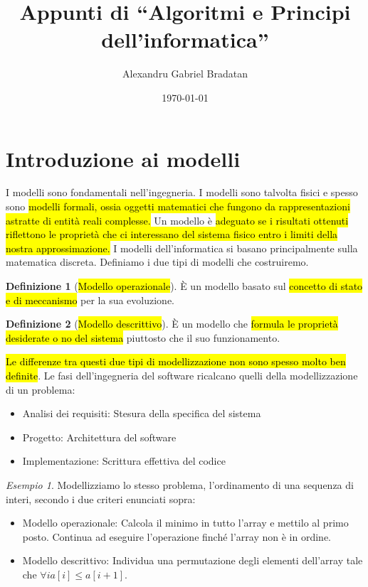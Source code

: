 \documentclass[a4paper,11pt,twoside]{article}
\title{Appunti di ``Algoritmi e Principi dell'informatica''}
\author{Alexandru Gabriel Bradatan}
\date{\today}
\theoremstyle{plain}
\theoremstyle{definition}
\newtheorem{defn}{Definizione}[section]
\theoremstyle{remark}
\newtheorem{esempio}{Esempio}[section]
\begin{document}
\maketitle
\tableofcontents
\newpage

\section{Introduzione ai modelli}\label{sec:modelli}

I modelli sono fondamentali nell'ingegneria. I modelli sono talvolta fisici e
spesso sono \hl{modelli formali, ossia oggetti matematici che fungono da
rappresentazioni astratte di entità reali complesse.} Un modello è \hl{adeguato
se i risultati ottenuti riflettono le proprietà che ci interessano del sistema
fisico entro i limiti della nostra approssimazione.} I modelli dell'informatica
si basano principalmente sulla matematica discreta. Definiamo i due tipi di
modelli che costruiremo.

\begin{defn}[\hl{Modello operazionale}]\label{def:modello-op}
  È un modello basato sul \hl{concetto di stato e di meccanismo} per la sua
  evoluzione.
\end{defn}

\begin{defn}[\hl{Modello descrittivo}]\label{def:modello-desc}
  È un modello che \hl{formula le proprietà desiderate o no del sistema}
  piuttosto che il suo funzionamento.
\end{defn}

\hl{Le differenze tra questi due tipi di modellizzazione non sono spesso molto
ben definite}. Le fasi dell'ingegneria del software ricalcano quelli della
modellizzazione di un problema:

\begin{itemize}
  \item Analisi dei requisiti: Stesura della specifica del sistema
  \item Progetto: Architettura del software
  \item Implementazione: Scrittura effettiva del codice
\end{itemize}

\begin{esempio}
  Modellizziamo lo stesso problema, l'ordinamento di una sequenza di interi,
  secondo i due criteri enunciati sopra:
  \begin{itemize}
    \item Modello operazionale: Calcola il minimo in tutto l'array e mettilo al
      primo posto. Continua ad eseguire l'operazione finché l'array non è in
      ordine.
    \item Modello descrittivo: Individua una permutazione degli elementi
      dell'array tale che \(\forall i a[i] \leq a[i+1]\).
  \end{itemize}
\end{esempio}
\end{document}
